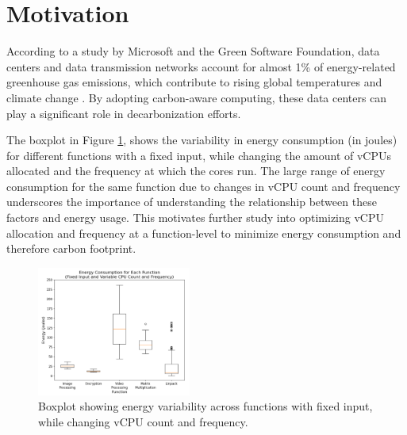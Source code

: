 \documentclass[times, 10pt,twocolumn]{article}
\begin{document}
\section{Motivation}

According to a study by Microsoft and the Green Software Foundation, data centers and data transmission networks account for almost 1\% of energy-related greenhouse gas emissions, which contribute to rising global temperatures and climate change \cite{carbon_aware_computing}. By adopting carbon-aware computing, these data centers can play a significant role in decarbonization efforts. 



The boxplot in Figure \ref{fig:energy_boxplot}, 
shows the variability in energy consumption (in joules) for different functions with a fixed input, while changing the amount of vCPUs allocated and the frequency at which the cores run. The large range of energy consumption for the same function due to changes in vCPU count and frequency underscores the importance of understanding the relationship between these factors and energy usage. This motivates further study into optimizing vCPU allocation and frequency at a function-level to minimize energy consumption and therefore carbon footprint. 


\begin{figure}[ht]
   \centering
   \includegraphics[width=0.45\textwidth]{imgs/energy_boxplot.png}
   \caption{Boxplot showing energy variability across functions with fixed input, while changing vCPU count and frequency. }
   \label{fig:energy_boxplot}
 \end{figure}
\end{document}
